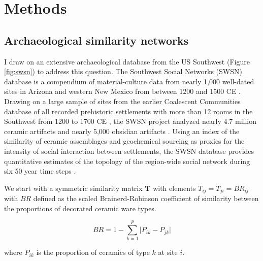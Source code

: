 \documentclass[fleqn,10pt]{wlscirep}
\begin{document}





\section*{Methods}

\subsection*{Archaeological similarity networks}

I draw on an extensive archaeological database from the US Southwest (Figure \ref{fig:swsn}) to address this question. The Southwest Social Networks (SWSN) database is a compendium of material-culture data from nearly 1,000 well-dated sites in Arizona and western New Mexico from between 1200 and 1500 CE \cite{Mills2012,Mills2013a,Peeples2013,Borck2015,Hill2015,Mills2015a}. Drawing on a large sample of sites from the earlier Coalescent Communities database of all recorded prehistoric settlements with more than 12 rooms in the Southwest from 1200 to 1700 CE \cite{Hill2004}, the SWSN project analyzed nearly 4.7 million ceramic artifacts and nearly 5,000 obsidian artifacts \cite{Mills2015a}. Using an index of the similarity of ceramic assemblages and geochemical sourcing as proxies for the intensity of social interaction between settlements, the SWSN database provides quantitative estimates of the topology of the region-wide social network during six 50 year time steps \cite{Mills2013a}.

We start with a symmetric similarity matrix $\mathbf{T}$ with elements $T_{ij} = T_{ji} = BR_{ij}$ with $BR$ defined as the scaled Brainerd-Robinson coefficient of similarity between the proportions of decorated ceramic ware types.

$$BR = 1 - \sum_{k=1}^{p} \lvert P_{ik} - P_{jk} \rvert$$

where $P_{ik}$ is the proportion of ceramics of type $k$ at site $i$.
\end{document}
